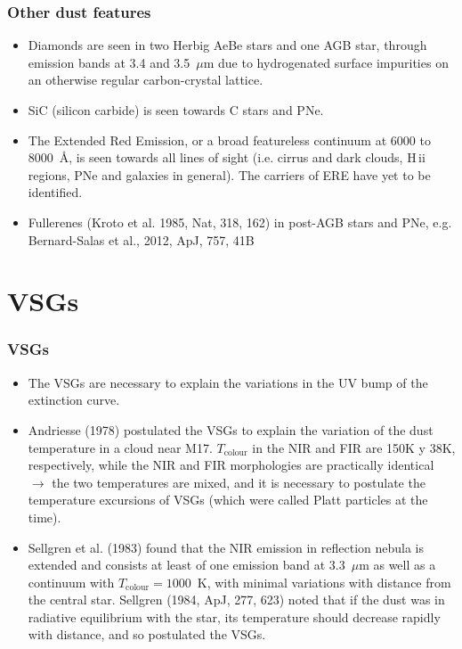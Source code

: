 \begin{frame}\frametitle{Other dust features}

\begin{itemize}
\item Diamonds are seen in two Herbig AeBe stars and one AGB star,
  through emission bands at 3.4 and 3.5~$\mu$m due to hydrogenated
  surface impurities on an otherwise regular carbon-crystal lattice.

\item SiC (silicon carbide) is seen towards C stars and PNe. 

\item The Extended Red Emission, or a broad featureless continuum at
  6000 to 8000~\AA, is seen towards all lines of sight (i.e. cirrus
  and dark clouds, H\,{\sc ii} regions, PNe and galaxies in
  general). The carriers of ERE have yet to be identified. 


\item Fullerenes (Kroto et al. 1985, Nat, 318, 162) in post-AGB stars and PNe, e.g. Bernard-Salas et al., 2012, ApJ, 757, 41B


\end{itemize}

\end{frame}

\section{VSGs}

\begin{frame}\frametitle{VSGs}



\begin{itemize}

\item  The VSGs are necessary to explain the variations in the UV bump
of the extinction curve.


\item Andriesse (1978) postulated the VSGs to explain the variation of
the dust temperature in a cloud near M17.  $T_\mathrm{colour}$ in the
NIR and FIR are 150K y 38K, respectively, while the NIR and FIR
morphologies are practically identical $\rightarrow$ the two
temperatures are mixed, and it is necessary to postulate the
temperature excursions of VSGs (which were called Platt particles at
the time). 

\item Sellgren et al. (1983) found  that the NIR emission in
reflection nebula is extended and consists at least of one emission
band at 3.3~$\mu$m as well as a continuum with $T_\mathrm{colour} =
1000$~K, with minimal variations with distance from the central star.
Sellgren (1984, ApJ, 277, 623) noted that if the dust was in radiative
equilibrium with the star, its temperature should decrease rapidly
with distance, and so postulated the VSGs.

\end{itemize}

\end{frame}



